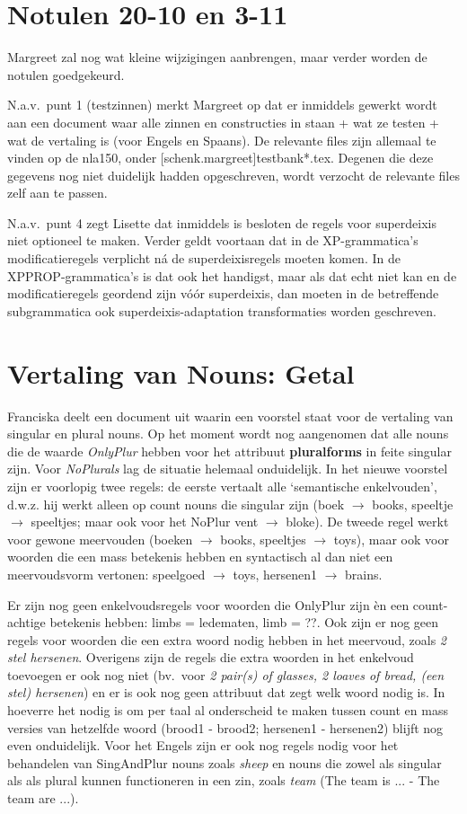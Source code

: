 \section{Notulen 20-10 en 3-11}
Margreet zal nog wat kleine wijzigingen aanbrengen, maar verder worden de 
notulen goedgekeurd. 

N.a.v.\ punt 1 (testzinnen) merkt Margreet op dat er inmiddels gewerkt wordt 
aan een 
document waar alle zinnen en constructies in staan + wat ze testen + wat de
vertaling is (voor Engels en Spaans). De relevante files zijn allemaal te 
vinden op de nla150, onder [schenk.margreet]testbank*.tex. Degenen die deze
gegevens nog niet duidelijk hadden opgeschreven, wordt verzocht de relevante
files zelf aan te passen.

N.a.v.\ punt 4 zegt Lisette dat inmiddels is besloten de regels 
voor superdeixis niet optioneel te maken. Verder geldt voortaan dat in de 
XP-grammatica's modificatieregels verplicht n\'{a} de superdeixisregels moeten 
komen. In de XPPROP-grammatica's is dat ook het handigst, maar als dat echt 
niet kan en de modificatieregels geordend zijn v\'{o}\'{o}r superdeixis, dan 
moeten in de betreffende subgrammatica ook superdeixis-adaptation 
transformaties worden geschreven.

\section{Vertaling van Nouns: Getal}
Franciska deelt een document uit waarin een voorstel staat voor de vertaling
van singular en plural nouns. Op het moment wordt nog aangenomen dat alle nouns 
die de waarde {\em OnlyPlur\/} hebben voor het attribuut {\bf pluralforms} in 
feite singular zijn. Voor {\em NoPlurals\/} lag de situatie helemaal 
onduidelijk. In het nieuwe voorstel zijn er voorlopig twee regels: de eerste 
vertaalt alle `semantische enkelvouden', d.w.z. hij werkt alleen op count nouns
die singular zijn (boek $\rightarrow$ books, speeltje $\rightarrow$ speeltjes; 
maar ook voor het NoPlur vent $\rightarrow$ bloke).
De tweede regel werkt voor gewone meervouden (boeken $\rightarrow$ books, 
speeltjes $\rightarrow$ toys), maar ook voor woorden die een mass betekenis 
hebben en syntactisch al dan niet een meervoudsvorm vertonen: speelgoed 
$\rightarrow$ toys, hersenen1 $\rightarrow$ brains.

Er zijn nog geen enkelvoudsregels voor woorden die OnlyPlur zijn \`{e}n een 
count-achtige betekenis hebben: limbs = ledematen, limb = ??. Ook zijn er nog 
geen regels voor woorden die een extra woord nodig hebben in het meervoud,
zoals {\em 2 stel hersenen\/}. 
Overigens zijn de regels die extra woorden in het enkelvoud toevoegen er 
ook nog niet (bv.\ voor {\em 2 pair(s) of glasses, 2 loaves of bread, (een stel) 
hersenen\/}) en er is ook nog geen attribuut dat zegt welk woord nodig is.
In hoeverre het nodig is om per taal al onderscheid te maken tussen count en 
mass versies van hetzelfde woord (brood1 - brood2; hersenen1 - hersenen2) blijft 
nog even onduidelijk. Voor het Engels zijn er ook nog regels nodig voor het 
behandelen van SingAndPlur nouns zoals {\em sheep\/} en nouns die zowel als 
singular als als plural kunnen functioneren in een zin, zoals {\em team\/} (The
team is ... - The team are ...).

